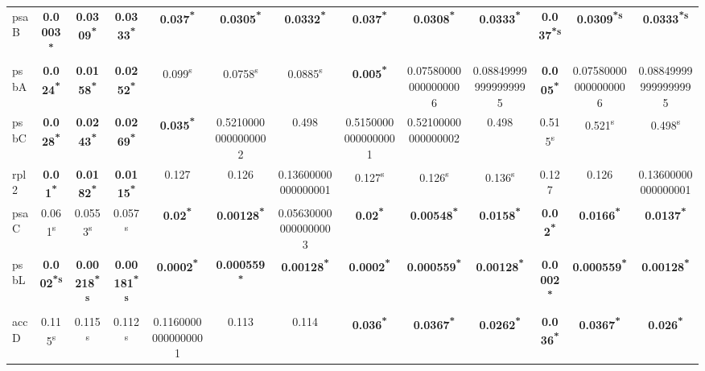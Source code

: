 \documentclass[a4paper]{article}
\begin{document}
\begin{longtable}{l|c|c|c|c|c|c|c|c|c|c|c|c}
psaB&\textbf{0.0003\textsuperscript{*}}&\textbf{0.0309\textsuperscript{*}}&\textbf{0.0333\textsuperscript{*}}&\textbf{0.037\textsuperscript{*}}&\textbf{0.0305\textsuperscript{*}}&\textbf{0.0332\textsuperscript{*}}&\textbf{0.037\textsuperscript{*}}&\textbf{0.0308\textsuperscript{*}}&\textbf{0.0333\textsuperscript{*}}&\textbf{0.037\textsuperscript{*}\textsuperscript{s}}&\textbf{0.0309\textsuperscript{*}\textsuperscript{s}}&\textbf{0.0333\textsuperscript{*}\textsuperscript{s}}\\
psbA&\textbf{0.024\textsuperscript{*}}&\textbf{0.0158\textsuperscript{*}}&\textbf{0.0252\textsuperscript{*}}&0.099\textsuperscript{s}&0.0758\textsuperscript{s}&0.0885\textsuperscript{s}&\textbf{0.005\textsuperscript{*}}&0.075800000000000006&0.088499999999999995&\textbf{0.005\textsuperscript{*}}&0.075800000000000006&0.088499999999999995\\
psbC&\textbf{0.028\textsuperscript{*}}&\textbf{0.0243\textsuperscript{*}}&\textbf{0.0269\textsuperscript{*}}&\textbf{0.035\textsuperscript{*}}&0.52100000000000002&0.498&0.51500000000000001&0.52100000000000002&0.498&0.515\textsuperscript{s}&0.521\textsuperscript{s}&0.498\textsuperscript{s}\\
rpl2&\textbf{0.01\textsuperscript{*}}&\textbf{0.0182\textsuperscript{*}}&\textbf{0.0115\textsuperscript{*}}&0.127&0.126&0.13600000000000001&0.127\textsuperscript{s}&0.126\textsuperscript{s}&0.136\textsuperscript{s}&0.127&0.126&0.13600000000000001\\
psaC&0.061\textsuperscript{s}&0.0553\textsuperscript{s}&0.057\textsuperscript{s}&\textbf{0.02\textsuperscript{*}}&\textbf{0.00128\textsuperscript{*}}&0.056300000000000003&\textbf{0.02\textsuperscript{*}}&\textbf{0.00548\textsuperscript{*}}&\textbf{0.0158\textsuperscript{*}}&\textbf{0.02\textsuperscript{*}}&\textbf{0.0166\textsuperscript{*}}&\textbf{0.0137\textsuperscript{*}}\\
psbL&\textbf{0.002\textsuperscript{*}\textsuperscript{s}}&\textbf{0.00218\textsuperscript{*}\textsuperscript{s}}&\textbf{0.00181\textsuperscript{*}\textsuperscript{s}}&\textbf{0.0002\textsuperscript{*}}&\textbf{0.000559\textsuperscript{*}}&\textbf{0.00128\textsuperscript{*}}&\textbf{0.0002\textsuperscript{*}}&\textbf{0.000559\textsuperscript{*}}&\textbf{0.00128\textsuperscript{*}}&\textbf{0.0002\textsuperscript{*}}&\textbf{0.000559\textsuperscript{*}}&\textbf{0.00128\textsuperscript{*}}\\
accD&0.115\textsuperscript{s}&0.115\textsuperscript{s}&0.112\textsuperscript{s}&0.11600000000000001&0.113&0.114&\textbf{0.036\textsuperscript{*}}&\textbf{0.0367\textsuperscript{*}}&\textbf{0.0262\textsuperscript{*}}&\textbf{0.036\textsuperscript{*}}&\textbf{0.0367\textsuperscript{*}}&\textbf{0.026\textsuperscript{*}}\\

\end{longtable}
\end{document}
